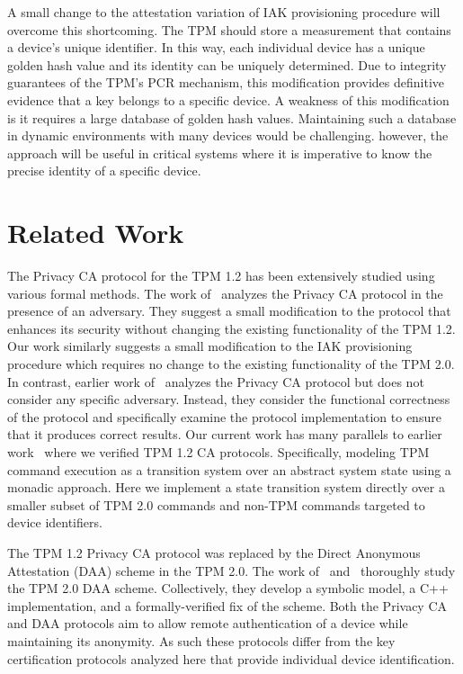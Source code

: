 \documentclass[runningheads]{llncs}
\begin{document}
A small change to the attestation variation of IAK provisioning
procedure will overcome this shortcoming. The TPM should store a
measurement that contains a device's unique identifier. In this way,
each individual device has a unique golden hash value and its identity
can be uniquely determined.  Due to integrity guarantees of the TPM's
PCR mechanism, this modification provides definitive evidence that a
key belongs to a specific device. A weakness of this modification
is it requires a large database of golden hash values. Maintaining
such a database in dynamic environments with many devices would be
challenging.  however, the approach will be useful in critical systems
where it is imperative to know the precise identity of a specific
device.
%
%
%
\section{Related Work}
The Privacy CA protocol for the TPM 1.2 has been extensively studied
using various formal methods.  The work
of~\citet{PrivacyCAAnalysis-Chen} analyzes the Privacy CA protocol in
the presence of an adversary. They suggest a small modification to the
protocol that enhances its security without changing the existing
functionality of the TPM 1.2. Our work similarly suggests a small
modification to the IAK provisioning procedure which requires no
change to the existing functionality of the TPM 2.0.  In contrast,
earlier work of~\citet{PrivacyCAAnalysis-Hall} analyzes the Privacy CA
protocol but does not consider any specific adversary. Instead, they
consider the functional correctness of the protocol and specifically
examine the protocol implementation to ensure that it produces correct
results.  Our current work has many parallels to earlier
work~\citep{PrivacyCAAnalysis-Hall} where we verified TPM 1.2 CA
protocols.  Specifically, modeling TPM command execution as a
transition system over an abstract system state using a monadic
approach. Here we implement a state transition system directly over a
smaller subset of TPM 2.0 commands and non-TPM commands targeted to
device identifiers.

The TPM 1.2 Privacy CA protocol was replaced by the Direct Anonymous
Attestation (DAA) scheme in the TPM 2.0.  The work
of~\citet{DAAAnalysis-Whit} and~\citet{DAAAnalysis-Wes} thoroughly
study the TPM 2.0 DAA scheme.  Collectively, they develop a symbolic
model, a C++ implementation, and a formally-verified fix of the
scheme. Both the Privacy CA and DAA protocols aim to allow remote
authentication of a device while maintaining its anonymity. As such
these protocols differ from the key certification protocols analyzed
here that provide individual device identification.
\end{document}
